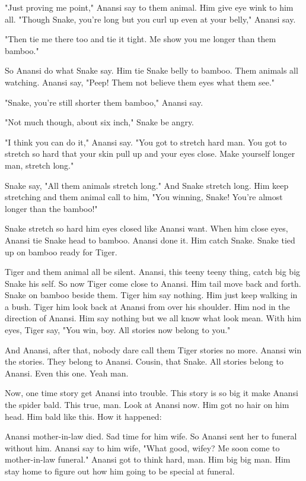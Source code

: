 "Just proving me point," Anansi say to them animal. Him give eye wink to him all. "Though Snake, you're long but you curl up even at your belly," Anansi say.

"Then tie me there too and tie it tight. Me show you me longer than them bamboo."

So Anansi do what Snake say. Him tie Snake belly to bamboo. Them animals all watching. Anansi say, "Peep! Them not believe them eyes what them see."

"Snake, you're still shorter them bamboo," Anansi say.

"Not much though, about six inch," Snake be angry.

"I think you can do it," Anansi say. "You got to stretch hard man. You got to stretch so hard that your skin pull up and your eyes close. Make yourself longer man, stretch long."

Snake say, "All them animals stretch long." And Snake stretch long. Him keep stretching and them animal call to him, "You winning, Snake! You're almost longer than the bamboo!"

Snake stretch so hard him eyes closed like Anansi want. When him close eyes, Anansi tie Snake head to bamboo. Anansi done it. Him catch Snake. Snake tied up on bamboo ready for Tiger.

Tiger and them animal all be silent. Anansi, this teeny teeny thing, catch big big Snake his self. So now Tiger come close to Anansi. Him tail move back and forth. Snake on bamboo beside them. Tiger him say nothing. Him just keep walking in a bush. Tiger him look back at Anansi from over his shoulder. Him nod in the direction of Anansi. Him say nothing but we all know what look mean. With him eyes, Tiger say, "You win, boy. All stories now belong to you."

And Anansi, after that, nobody dare call them Tiger stories no more. Anansi win the stories. They belong to Anansi. Cousin, that Snake. All stories belong to Anansi. Even this one. Yeah man.

Now, one time story get Anansi into trouble. This story is so big it make Anansi the spider bald. This true, man. Look at Anansi now. Him got no hair on him head. Him bald like this. How it happened:

Anansi mother-in-law died. Sad time for him wife. So Anansi sent her to funeral without him. Anansi say to him wife, "What good, wifey? Me soon come to mother-in-law funeral." Anansi got to think hard, man. Him big big man. Him stay home to figure out how him going to be special at funeral.

